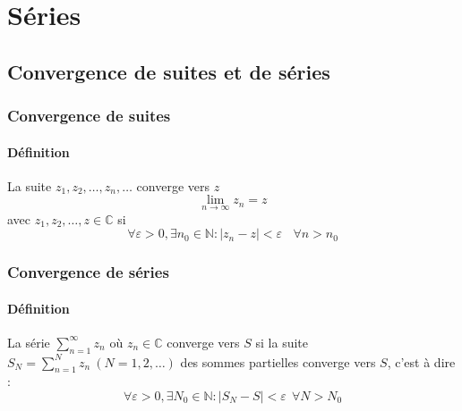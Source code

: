 \chapter{Séries}
\section{Convergence de suites et de séries}
	\subsection{Convergence de suites}
	\subsubsection{Définition}
	La suite $z_1,z_2,\dots,z_n,\dots$ converge vers $z$
	\begin{equation}
	\lim\limits_{n\rightarrow \infty} z_n = z
	\end{equation}
	avec $z_1,z_2,\dots,z \in \mathbb{C}$ si 
	\begin{equation}
	\forall\varepsilon > 0, \exists n_0 \in \mathbb{N} : |z_n-z| < \varepsilon \ \ \ \
	\forall n > n_0
	\end{equation}
	
	
	
	\subsection{Convergence de séries}
	\subsubsection{Définition}
	La série $\sum_{n=1}^\infty z_n$ où $z_n \in \mathbb{C}$ converge vers $S$ si la suite 
	$S_N = \sum_{n=	1}^{N} z_n\ (N=1,2,\dots)$ des sommes partielles converge vers $S$, c'est
	 à dire :
	\begin{equation}
	\forall\varepsilon > 0, \exists N_0\in\mathbb{N} : |S_N-S| < \varepsilon\ \ \forall N>N_0
	\end{equation}

